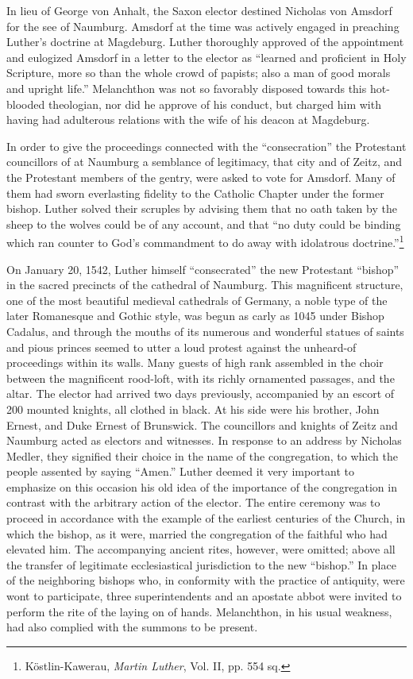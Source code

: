 In lieu of George von Anhalt, the Saxon elector destined Nicholas
von Amsdorf for the see of Naumburg. Amsdorf at the time was actively
engaged in preaching Luther’s doctrine at Magdeburg. Luther
thoroughly approved of the appointment and eulogized Amsdorf in a
letter to the elector as “learned and proficient in Holy Scripture, more
so than the whole crowd of papists; also a man of good morals and upright
life.” Melanchthon was not so favorably disposed towards this
hot-blooded theologian, nor did he approve of his conduct, but charged
him with having had adulterous relations with the wife of his deacon
at Magdeburg.

In order to give the proceedings connected with the “consecration”
the Protestant councillors of at Naumburg a semblance of legitimacy,
that city and of Zeitz, and the Protestant members of the gentry,
were asked to vote for Amsdorf. Many of them had sworn everlasting fidelity
to the Catholic Chapter under the former bishop. Luther
solved their scruples by advising them that no oath taken by the
sheep to the wolves could be of any account, and that “no duty could
be binding which ran counter to God’s commandment to do away
with idolatrous doctrine.”\footnote{Köstlin-Kawerau, \textit{Martin Luther}, Vol. II, pp. 554 sq.}

On January 20, 1542, Luther himself “consecrated” the new Protestant
“bishop” in the sacred precincts of the cathedral of Naumburg.
This magnificent structure, one of the most beautiful medieval cathedrals
of Germany, a noble type of the later Romanesque and Gothic
style, was begun as carly as 1045 under Bishop Cadalus, and through
the mouths of its numerous and wonderful statues of saints and pious
princes seemed to utter a loud protest against the unheard-of proceedings
within its walls. Many guests of high rank assembled in the choir
between the magnificent rood-loft, with its richly ornamented passages,
and the altar. The elector had arrived two days previously, accompanied
by an escort of 200 mounted knights, all clothed in black.
At his side were his brother, John Ernest, and Duke Ernest of Brunswick.
The councillors and knights of Zeitz and Naumburg acted as
electors and witnesses. In response to an address by Nicholas Medler,
they signified their choice in the name of the congregation, to which
the people assented by saying “Amen.” Luther deemed it very important
to emphasize on this occasion his old idea of the importance
of the congregation in contrast with the arbitrary action of the elector.
The entire ceremony was to proceed in accordance with the example of
the earliest centuries of the Church, in which the bishop,
as it were, married the congregation of the faithful who had elevated
him. The accompanying ancient rites, however, were omitted; above
all the transfer of legitimate ecclesiastical jurisdiction to the new
“bishop.” In place of the neighboring bishops who, in conformity with
the practice of antiquity, were wont to participate, three superintendents
and an apostate abbot were invited to perform the rite of the
laying on of hands. Melanchthon, in his usual weakness, had also complied
with the summons to be present.

